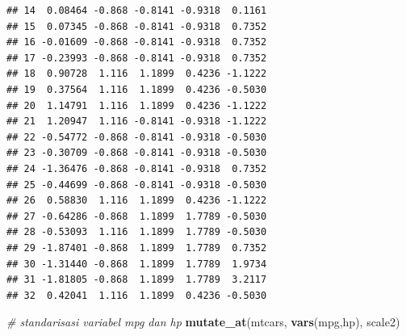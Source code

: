 \documentclass[]{book}
\newenvironment{Shaded}{\begin{snugshade}}{\end{snugshade}}
\newcommand{\KeywordTok}[1]{\textcolor[rgb]{0.13,0.29,0.53}{\textbf{#1}}}
\newcommand{\CommentTok}[1]{\textcolor[rgb]{0.56,0.35,0.01}{\textit{#1}}}
\newcommand{\NormalTok}[1]{#1}
\begin{document}
\begin{verbatim}
## 14  0.08464 -0.868 -0.8141 -0.9318  0.1161
## 15  0.07345 -0.868 -0.8141 -0.9318  0.7352
## 16 -0.01609 -0.868 -0.8141 -0.9318  0.7352
## 17 -0.23993 -0.868 -0.8141 -0.9318  0.7352
## 18  0.90728  1.116  1.1899  0.4236 -1.1222
## 19  0.37564  1.116  1.1899  0.4236 -0.5030
## 20  1.14791  1.116  1.1899  0.4236 -1.1222
## 21  1.20947  1.116 -0.8141 -0.9318 -1.1222
## 22 -0.54772 -0.868 -0.8141 -0.9318 -0.5030
## 23 -0.30709 -0.868 -0.8141 -0.9318 -0.5030
## 24 -1.36476 -0.868 -0.8141 -0.9318  0.7352
## 25 -0.44699 -0.868 -0.8141 -0.9318 -0.5030
## 26  0.58830  1.116  1.1899  0.4236 -1.1222
## 27 -0.64286 -0.868  1.1899  1.7789 -0.5030
## 28 -0.53093  1.116  1.1899  1.7789 -0.5030
## 29 -1.87401 -0.868  1.1899  1.7789  0.7352
## 30 -1.31440 -0.868  1.1899  1.7789  1.9734
## 31 -1.81805 -0.868  1.1899  1.7789  3.2117
## 32  0.42041  1.116  1.1899  0.4236 -0.5030
\end{verbatim}

\begin{Shaded}
\begin{Highlighting}[]
\CommentTok{# standarisasi variabel mpg dan hp}
\KeywordTok{mutate_at}\NormalTok{(mtcars, }\KeywordTok{vars}\NormalTok{(mpg,hp), scale2)}
\end{Highlighting}
\end{Shaded}
\end{document}
